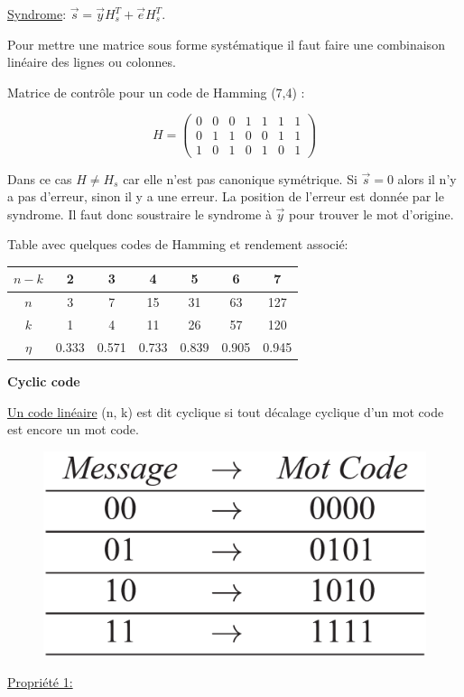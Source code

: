 \underline{Syndrome}: $\overrightarrow{s}= \overrightarrow{y}H_s^T+\overrightarrow{e}H_s^T$.

Pour mettre une matrice sous forme systématique il faut faire une combinaison linéaire des lignes ou colonnes.

Matrice de contrôle pour un code de Hamming (7,4) :

\setlength{\abovedisplayskip}{-2pt}
\setlength{\belowdisplayskip}{-2pt}
\begin{figure}
    \begin{equation*}
        H = \begin{pmatrix}
            0 & 0 & 0 & 1 & 1 & 1 & 1 \\
            0 & 1 & 1 & 0 & 0 & 1 & 1 \\
            1 & 0 & 1 & 0 & 1 & 0 & 1
        \end{pmatrix}
    \end{equation*}
\end{figure}
Dans ce cas $H\neq H_s$ car elle n'est pas canonique symétrique.
Si $\overrightarrow{s} = 0$ alors il n'y a pas d'erreur, sinon il y a une erreur. La position de
l'erreur est donnée par le syndrome. Il faut donc soustraire le syndrome à $\overrightarrow{y}$
pour trouver le mot d'origine.

Table avec quelques codes de Hamming et rendement associé:

\begin{tabular}{|ccccccc|}
    \hline
    $n - k$ & 2     & 3     & 4     & 5     & 6     & 7     \\
    \hline
    $n$     & 3     & 7     & 15    & 31    & 63    & 127   \\
    \hline
    $k$     & 1     & 4     & 11    & 26    & 57    & 120   \\
    \hline
    $\eta$  & 0.333 & 0.571 & 0.733 & 0.839 & 0.905 & 0.945 \\
    \hline
\end{tabular}

\textbf{Cyclic code}

\underline{Un code linéaire} (n, k) est dit cyclique si tout décalage cyclique d'un mot code est encore un mot code.

\setlength{\intextsep}{-5pt}
\begin{figure}
    \includegraphics[width=\linewidth]{images/code_cyclique.png}
\end{figure}
\underline{Propriété 1:}

